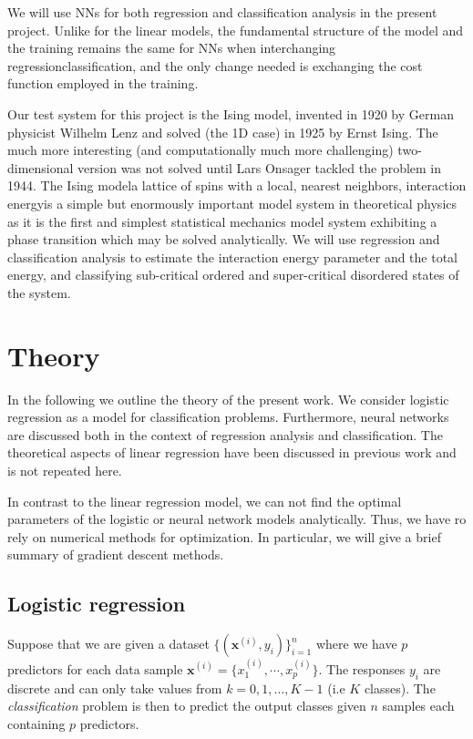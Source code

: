 \documentclass[a4paper, twocolumn]{article}
\begin{document}
We will use NNs for both regression and classification analysis in the present project. Unlike for the linear models, the fundamental structure of the model and the training remains the same for NNs when interchanging regression\ce{<=>}classification, and the only change needed is exchanging the cost function employed in the training. 

Our test system for this project is the Ising model, invented in 1920 by German physicist Wilhelm Lenz and solved (the 1D case) in 1925 by Ernst Ising\autocite{Ising1925}. The much more interesting (and computationally much more challenging) two-dimensional version was not solved until Lars Onsager tackled the problem in 1944\autocite{onsager1944crystal}. The Ising model\textemdash a lattice of spins with a local, nearest neighbors, interaction energy\textemdash is a simple but enormously important model system in theoretical physics as it is the first and simplest statistical mechanics model system exhibiting a phase transition which may be solved analytically\autocite{mccoy2012importance}. We will use regression and classification analysis to estimate the interaction energy parameter and the total energy, and classifying sub-critical ordered and super-critical disordered states of the system.

\section{Theory}
In the following we outline the theory of the present work. We 
consider logistic regression as a model for classification problems. Furthermore, neural networks are discussed 
both in the context of regression analysis and classification. The theoretical aspects of linear regression have been 
discussed in previous work and is not repeated here.

In contrast to the linear regression model, we can not find the optimal parameters of the logistic or neural network 
models analytically. Thus, we have ro rely on numerical methods for optimization. In particular, we will give a brief summary
of gradient descent methods.

\subsection{Logistic regression}
Suppose that we are given a dataset $\{ (\mathbf{x}^{(i)}, y_i) \}_{i=1}^n $ where we have $p$ predictors 
for each data sample $\mathbf{x}^{(i)} = \{ x_1^{(i)}, \cdots, x_p^{(i)} \}$. The responses $y_i$ are discrete and 
can only take values from $k=0,1,\dots,K-1$ (i.e $K$ classes). The \textit{classification} problem is then to predict 
the output classes given $n$ samples each containing $p$ predictors. 
\end{document}
